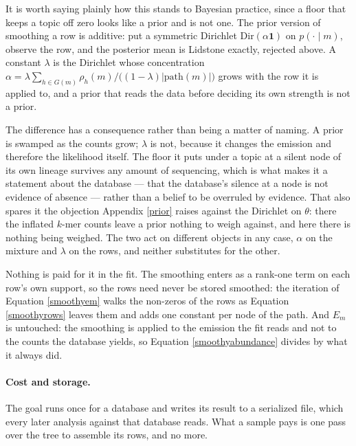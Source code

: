 \documentclass[pdflatex,sn-vancouver-num]{sn-jnl}
\begin{document}
    It is worth saying plainly how this stands to Bayesian practice, since a floor that keeps a topic
    off zero looks like a prior and is not one. The prior version of smoothing a row is additive: put
    a symmetric Dirichlet $\mathrm{Dir}(\alpha \mathbf{1})$ on $p(\cdot \mid m)$, observe the row,
    and the posterior mean is Lidstone exactly, rejected above. A constant $\lambda$ is
    the Dirichlet whose concentration $\alpha = \lambda \sum_{h \in G(m)} \rho_h(m) / \bigl( (1 - \lambda) \lvert
    \mathrm{path}(m) \rvert \bigr)$ grows with the row it is applied to, and a prior that reads the
    data before deciding its own strength is not a prior.

    The difference has a consequence rather than being a matter of naming. A prior is swamped as the
    counts grow; $\lambda$ is not, because it changes the emission and therefore the likelihood
    itself. The floor it puts under a topic at a silent node of its own lineage survives any amount
    of sequencing, which is what makes it a statement about the database --- that the database's
    silence at a node is not evidence of absence --- rather than a belief to be overruled by
    evidence. That also spares it the objection Appendix \ref{prior} raises against the Dirichlet on
    $\theta$: there the inflated $k$-mer counts leave a prior nothing to weigh against, and here
    there is nothing being weighed. The two act on different objects in any case, $\alpha$ on the
    mixture and $\lambda$ on the rows, and neither substitutes for the other.

    Nothing is paid for it in the fit. The smoothing enters as a rank-one term on each row's own
    support, so the rows need never be stored smoothed: the iteration of
    Equation \eqref{smoothyem} walks the non-zeros of the rows as Equation \eqref{smoothyrows} leaves
    them and adds one constant per node of the path. And $E_m$ is untouched: the smoothing is applied
    to the emission the fit reads and not to the counts the database yields, so
    Equation \eqref{smoothyabundance} divides by what it always did.

    \paragraph{Cost and storage.} The goal runs once for a database and writes its result to a
    serialized file, which every later analysis against that database reads. What a sample pays is
    one pass over the tree to assemble its rows, and no more.
\end{document}

